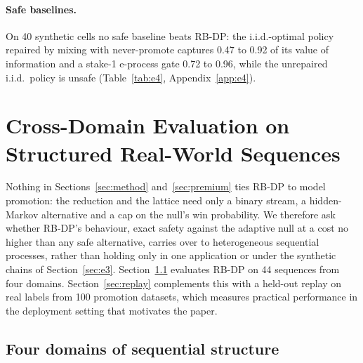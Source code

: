 \documentclass{article}
\theoremstyle{plain}
\theoremstyle{definition}
\theoremstyle{remark}
\begin{document}
\paragraph{Safe baselines.}
\label{sec:e4}
On 40 synthetic cells no safe baseline beats RB-DP: the i.i.d.-optimal policy repaired by mixing with never-promote captures 0.47 to 0.92 of its value of information and a stake-1 e-process gate 0.72 to 0.96, while the unrepaired i.i.d.\ policy is unsafe (Table~\ref{tab:e4}, Appendix~\ref{app:e4}).

\section{Cross-Domain Evaluation on Structured Real-World Sequences}
\label{sec:real}

Nothing in Sections~\ref{sec:method} and~\ref{sec:premium} ties RB-DP to model promotion: the reduction and the lattice need only a binary stream, a hidden-Markov alternative and a cap on the null's win probability. We therefore ask whether RB-DP's behaviour, exact safety against the adaptive null at a cost no higher than any safe alternative, carries over to heterogeneous sequential processes, rather than holding only in one application or under the synthetic chains of Section~\ref{sec:e3}. Section~\ref{sec:panel} evaluates RB-DP on 44 sequences from four domains. Section~\ref{sec:replay} complements this with a held-out replay on real labels from 100 promotion datasets, which measures practical performance in the deployment setting that motivates the paper.

\subsection{Four domains of sequential structure}
\label{sec:panel}
\end{document}

